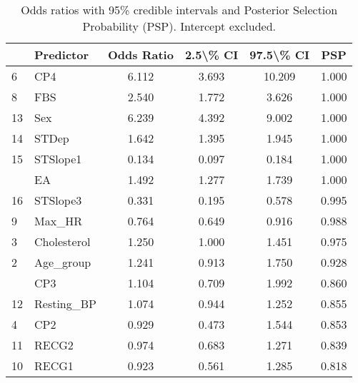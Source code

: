 \begin{table}

\caption{Odds ratios with 95\% credible intervals and Posterior Selection Probability (PSP). Intercept excluded.}
\centering
\begin{tabular}[t]{llcccc}
\toprule
  & Predictor & Odds Ratio & 2.5\textbackslash{}\% CI & 97.5\textbackslash{}\% CI & PSP\\
\midrule
6 & CP4 & 6.112 & 3.693 & 10.209 & 1.000\\
8 & FBS & 2.540 & 1.772 & 3.626 & 1.000\\
13 & Sex & 6.239 & 4.392 & 9.002 & 1.000\\
14 & STDep & 1.642 & 1.395 & 1.945 & 1.000\\
15 & STSlope1 & 0.134 & 0.097 & 0.184 & 1.000\\
\addlinespace
7 & EA & 1.492 & 1.277 & 1.739 & 1.000\\
16 & STSlope3 & 0.331 & 0.195 & 0.578 & 0.995\\
9 & Max\_HR & 0.764 & 0.649 & 0.916 & 0.988\\
3 & Cholesterol & 1.250 & 1.000 & 1.451 & 0.975\\
2 & Age\_group & 1.241 & 0.913 & 1.750 & 0.928\\
\addlinespace
5 & CP3 & 1.104 & 0.709 & 1.992 & 0.860\\
12 & Resting\_BP & 1.074 & 0.944 & 1.252 & 0.855\\
4 & CP2 & 0.929 & 0.473 & 1.544 & 0.853\\
11 & RECG2 & 0.974 & 0.683 & 1.271 & 0.839\\
10 & RECG1 & 0.923 & 0.561 & 1.285 & 0.818\\
\bottomrule
\end{tabular}
\end{table}
